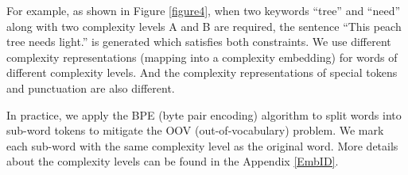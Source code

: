 \documentclass[11pt]{article}
\begin{document}
For example, as shown in Figure \ref{figure4}, when two keywords ``tree'' and ``need'' along with two complexity levels A and B are required, the sentence ``This peach tree needs light.'' is generated which satisfies both constraints. We use different complexity representations (mapping into a complexity embedding) for words of different complexity levels. And the complexity representations of special tokens and punctuation are also different.

In practice, we apply the BPE (byte pair encoding) \cite{sennrich2015neural} algorithm to split words into sub-word tokens to mitigate the OOV (out-of-vocabulary) problem. We mark each sub-word with the same complexity level as the original word.
More details about the complexity levels can be found in the Appendix \ref{EmbID}.


 
 
 
\end{document}
